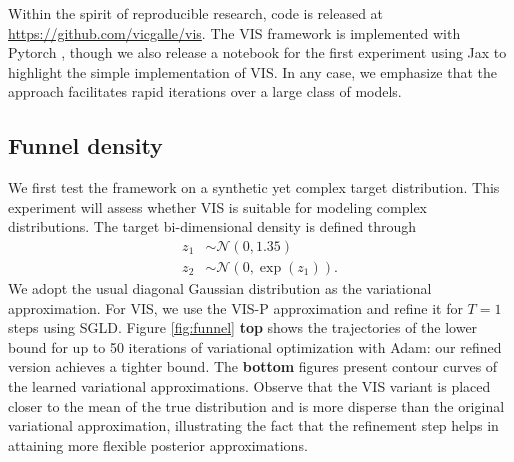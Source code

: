 Within the spirit of reproducible research, 
code is released at %
\url{https://github.com/vicgalle/vis}. 
The VIS framework is implemented with Pytorch \cite{paszke2017automatic}, though we also release a notebook for the first experiment using Jax to highlight the simple implementation of VIS.
In any case, we emphasize that the approach facilitates 
rapid iterations over a large class of models. 

\subsection{Funnel density}

We first test the framework on a synthetic yet complex target distribution. This experiment will assess whether VIS is
suitable for modeling complex distributions. The target bi-dimensional density is defined through
\begin{align*}
    z_1 &\sim \mathcal{N}(0, 1.35) \\
    z_2 &\sim \mathcal{N}(0, \exp(z_1)).
\end{align*}
We adopt the usual diagonal Gaussian distribution
as the variational approximation. 
For VIS, we use the VIS-P approximation and refine it for $T = 1$ steps using SGLD. Figure \ref{fig:funnel} {\bf top} shows the trajectories of the lower bound for up to 50 iterations of variational optimization with Adam: our refined version achieves a tighter bound. The {\bf bottom} figures present  contour curves of the learned variational approximations. Observe that the VIS variant is placed closer to the mean of the true distribution and is more disperse than the original variational approximation, illustrating the fact that the refinement step helps in attaining more flexible posterior approximations.

